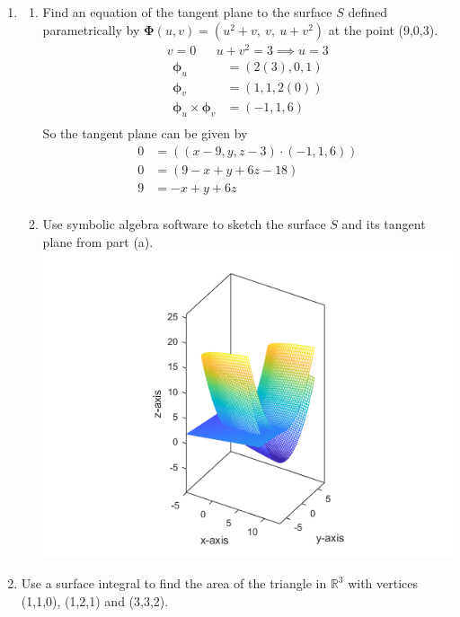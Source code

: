 \documentclass{article}
\begin{document}
\thispagestyle{fancy}

\begin{enumerate}
    \item
    \begin{enumerate}
        \item Find an equation of the tangent plane to the surface $S$ defined parametrically by $\boldsymbol \Phi(u, v) = (u^2 + v,\ v,\ u+v^2)$ at the point (9,0,3).
        \begin{align*}
            &v = 0 & &u + v^2 = 3 \implies u = 3&
        \end{align*}
        \begin{align*}
            \boldsymbol \phi_u &= (2(3), 0, 1) \\
            \boldsymbol \phi_v &= (1,1,2(0)) \\
            \boldsymbol \phi_u \times \boldsymbol \phi_v &= (-1,1,6) \\
        \end{align*}
        So the tangent plane can be given by
        \begin{align*}
            0 &= ((x - 9, y, z - 3) \cdot (-1,1,6)) \\
            0 &= (9 - x + y + 6z - 18) \\
            9 &= -x + y + 6z \\
        \end{align*}
        \item Use symbolic algebra software to sketch the surface $S$ and its tangent plane from part (a).
        \includegraphics[width=\textwidth]{b42-a7-1b}
    \end{enumerate}
    \item Use a surface integral to find the area of the triangle in $\mathbb{R}^3$ with vertices (1,1,0), (1,2,1) and (3,3,2).
    

\end{enumerate}
\end{document}
